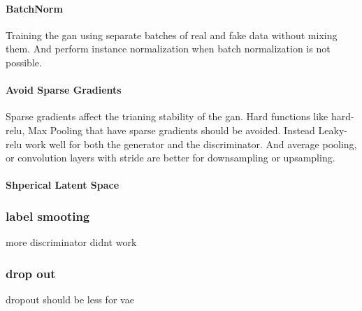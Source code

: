 \paragraph{BatchNorm}
Training the \ac{gan} using separate batches of real and fake data without mixing them. And perform instance normalization when batch normalization is not possible.

\paragraph{Avoid Sparse Gradients}
Sparse gradients affect the trianing stability of the \ac{gan}. Hard functions like hard- \ac{relu}, Max Pooling that have sparse gradients should be avoided. Instead Leaky-\ac{relu} work well for both the generator and the discriminator. And average pooling, or convolution layers with stride are better for downsampling or upsampling.



\paragraph{Shperical Latent Space}

\subsubsection{label smooting}
more discriminator didnt work

\subsubsection{drop out}
dropout should be less for vae
